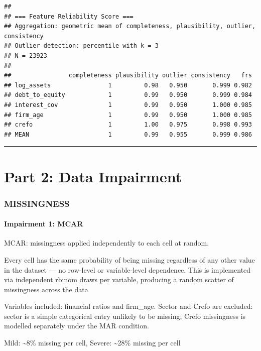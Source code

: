 \documentclass[
]{article}
\begin{document}
\begin{verbatim}
## 
## === Feature Reliability Score ===
## Aggregation: geometric mean of completeness, plausibility, outlier, consistency 
## Outlier detection: percentile with k = 3 
## N = 23923 
## 
##                completeness plausibility outlier consistency   frs
## log_assets                1         0.98   0.950       0.999 0.982
## debt_to_equity            1         0.99   0.950       0.999 0.984
## interest_cov              1         0.99   0.950       1.000 0.985
## firm_age                  1         0.99   0.950       1.000 0.985
## crefo                     1         1.00   0.975       0.998 0.993
## MEAN                      1         0.99   0.955       0.999 0.986
\end{verbatim}

\begin{center}\rule{0.5\linewidth}{0.5pt}\end{center}

\section{Part 2: Data Impairment}\label{part-2-data-impairment}

\subsubsection{MISSINGNESS}\label{missingness}

\paragraph{\texorpdfstring{\textbf{Impairment 1:
MCAR}}{Impairment 1: MCAR}}\label{impairment-1-mcar}

MCAR: missingness applied independently to each cell at random.

Every cell has the same probability of being missing regardless of any
other value in the dataset --- no row-level or variable-level
dependence. This is implemented via independent rbinom draws per
variable, producing a random scatter of missingness across the data

Variables included: financial ratios and firm\_age. Sector and Crefo are
excluded: sector is a simple categorical entry unlikely to be missing;
Crefo missingness is modelled separately under the MAR condition.

Mild: \textasciitilde8\% missing per cell, Severe: \textasciitilde28\%
missing per cell
\end{document}
